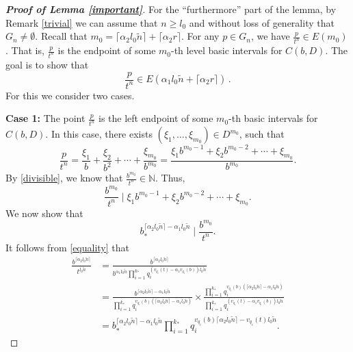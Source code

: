 \documentclass[12pt]{article}
\theoremstyle{definition}
\theoremstyle{remark}
\begin{document}
\begin{proof}[\rm \textbf{Proof of Lemma \ref{important}}]
\medskip 

For the ``furthermore'' part of the lemma, by Remark \ref{trivial}  we can assume  that $n\geq l_{0}$ and without loss of generality that $G_{n}\neq\emptyset$. Recall that $m_{0}=\lceil\alpha_{2}l_{0}\tilde{n}\rceil+\lceil\alpha_{2}r\rceil$. For any $p\in G_{n}$, we have $\frac{p}{t^{n}}\in E(m_{0})$. That is, $\frac{p}{t^{n}}$ is the endpoint of some $m_{0}$-th level  basic intervals for $C(b,D)$.  The goal is to show that  
\begin{equation}   \label{svqaz}
\frac{p}{t^{n}}\in E(\alpha_{1}l_{0}\tilde{n} +\lceil\alpha_{2}r\rceil)  \, .    
\end{equation}
For this we consider two cases. 
\medskip 

\noindent \textbf{Case 1:} The point $\frac{p}{t^{n}}$ is the  left endpoint of some $m_{0}$-th basic intervals for $C(b,D)$. In this case,
there exists $(\xi_{1},\ldots,\xi_{m_{0}})\in D^{m_{0}}$, such that
$$\frac{p}{t^{n}}=\frac{\xi_{1}}{b}+\frac{\xi_{2}}{b^{2}}+\cdots+\frac{\xi_{ m_{0}}}{b^{m_{0}}}=\frac{\xi_{1}b^{m_{0}-1}+\xi_{2}b^{m_{0}-2}+\cdots+ \xi_{ m_{0}}}{b^{m_{0} }}.$$
By \eqref{divisible}, we know that $\frac{b^{m_{0}}}{t^{ n}}\in\mathbb{N}$. Thus,
\begin{equation}\label{divisible1}
\frac{b^{m_{0}}}{t^{n}}\mid\xi_{1}b^{m_{0}-1}+\xi_{2}b^{m_{0}-2}+\cdots+ \xi_{ m_{0}} .
\end{equation}
We  now show that 
\begin{equation}\label{divisible2}
b_{*}^{\lceil\alpha_{2}l_{0}\tilde{n}\rceil-\alpha_{1}l_{0}\tilde{n}}\mid\frac{b^{m_{0}}}{t^{n}}.
\end{equation}
It follows from \eqref{equality} that
\begin{equation*}
\begin{aligned}
\frac{b^{\lceil\alpha_{2}l_{0}\tilde{n}\rceil}}{t^{l_{0}\tilde{n}}}&=\frac{b^{\lceil\alpha_{2}l_{0}\tilde{n}\rceil}}{b^{\alpha_{1}l_{0}\tilde{n}}\prod_{i=1}^{k_{*}}q_{i}^{(v_{q_{i}}(t)-\alpha_{1}v_{q_{i}}(b))l_{0}\tilde{n}}} \\[2ex]
&=\frac{b^{\lceil\alpha_{2}l_{0}\tilde{n}\rceil-\alpha_{1}l_{0}\tilde{n}}}{\prod_{i=1}^{k_{*}}q_{i}^{v_{q_{i}}(b)(\lceil\alpha_{2}l_{0}\tilde{n}\rceil-\alpha_{1}l_{0}\tilde{n})}}\times
\frac{\prod_{i=1}^{k_{*}}q_{i}^{v_{q_{i}}(b)(\lceil\alpha_{2}l_{0}\tilde{n}\rceil-\alpha_{1}l_{0}\tilde{n})}}{\prod_{i=1}^{k_{*}}q_{i}^{(v_{q_{i}}(t)-\alpha_{1}v_{q_{i}}(b))l_{0}\tilde{n}}}  \\[2ex]
&=b_{*}^{\lceil\alpha_{2}l_{0}\tilde{n}\rceil-\alpha_{1}l_{0}\tilde{n}}\prod_{i=1}^{k_{*}}q_{i}^{v_{q_{i}}(b)\lceil\alpha_{2}l_{0}\tilde{n}\rceil-v_{q_{i}}(t)l_{0}\tilde{n}}.

\end{aligned}
\end{equation*}
\end{proof}
\end{document}
